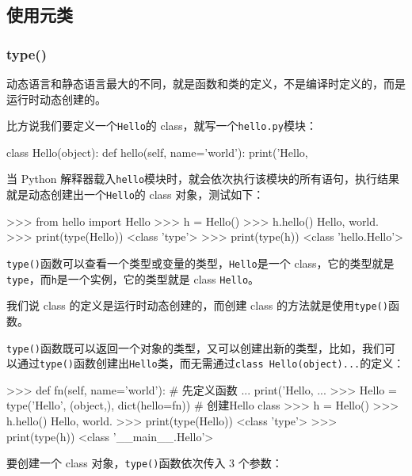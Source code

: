 \hypertarget{ux4f7fux7528ux5143ux7c7b}{%
\subsection{使用元类}\label{ux4f7fux7528ux5143ux7c7b}}

\hypertarget{type}{%
\subsubsection{type()}\label{type}}

动态语言和静态语言最大的不同，就是函数和类的定义，不是编译时定义的，而是运行时动态创建的。

比方说我们要定义一个\texttt{Hello}的
class，就写一个\texttt{hello.py}模块：

\begin{pythoncode}
class Hello(object):
    def hello(self, name='world'):
        print('Hello, %
\end{pythoncode}

当 Python
解释器载入\texttt{hello}模块时，就会依次执行该模块的所有语句，执行结果就是动态创建出一个\texttt{Hello}的
class 对象，测试如下：

\begin{pythoncode}
>>> from hello import Hello
>>> h = Hello()
>>> h.hello()
Hello, world.
>>> print(type(Hello))
<class 'type'>
>>> print(type(h))
<class 'hello.Hello'>
\end{pythoncode}

\texttt{type()}函数可以查看一个类型或变量的类型，\texttt{Hello}是一个
class，它的类型就是\texttt{type}，而\texttt{h}是一个实例，它的类型就是
class \texttt{Hello}。

我们说 class 的定义是运行时动态创建的，而创建 class
的方法就是使用\texttt{type()}函数。

\texttt{type()}函数既可以返回一个对象的类型，又可以创建出新的类型，比如，我们可以通过\texttt{type()}函数创建出\texttt{Hello}类，而无需通过\texttt{class\ Hello(object)...}的定义：

\begin{pythoncode}
>>> def fn(self, name='world'): # 先定义函数
...     print('Hello, %
...
>>> Hello = type('Hello', (object,), dict(hello=fn)) # 创建Hello class
>>> h = Hello()
>>> h.hello()
Hello, world.
>>> print(type(Hello))
<class 'type'>
>>> print(type(h))
<class '__main__.Hello'>
\end{pythoncode}

要创建一个 class 对象，\texttt{type()}函数依次传入 3 个参数：

